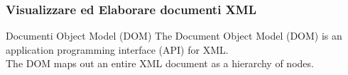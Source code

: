 \begin{frame}
    \frametitle{Visualizzare ed Elaborare documenti XML}
    \addtocounter{nframe}{1}
    

     \begin{block}{Documenti Object Model (DOM)}
        The Document Object Model (DOM) is an application programming interface (API) for XML.
        \\ The DOM maps out an entire XML document as a hierarchy of nodes.

     \end{block}


    
\end{frame}


